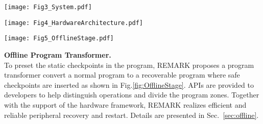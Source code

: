 \begin{figure*}[!htbp]
    \centering
    \texttt{[image: Fig3\_System.pdf]}
    \caption{The HW/SW co-designed system diagram of REMARK.}
    \label{fig:SystemArchitecture}
\end{figure*}

%
\begin{figure*}[!htpb]
    \centering
    \texttt{[image: Fig4\_HardwareArchitecture.pdf]}
    \caption{The hardware architecture of REMARK and its main modules. }
    \label{fig:HardwareArchitecture}
\end{figure*}

\begin{figure*}[!htbp]
    \centering
    \texttt{[image: Fig5\_OfflineStage.pdf]}
    \caption{The program pre-processes during the software transformation stage.}
    \label{fig:OfflineStage}
\end{figure*}


\noindent\textbf{Offline Program Transformer.} \\
%
To preset the static checkpoints in the program, REMARK proposes a program transformer convert a normal program to a recoverable program where safe checkpoints are inserted as shown in Fig.\ref{fig:OfflineStage}.
APIs are provided to developers to help distinguish operations and divide the program zones.
Together with the support of the hardware framework, REMARK realizes efficient and reliable peripheral recovery and restart.
Details are presented in Sec.~\ref{sec:offline}.


\begin{comment}
\noindent\textbf{Online Recover Procedure.} \\
With the support of hardware architecture and the offline program transformer, an online recover procedure is proposed containing two parts, peripheral configuration and restart.
Based on PSRs, REMARK adopts an `init-used' strategy which only initializes and configures the invoked peripherals to avoid redundant reconfiguration overheads.
A config function queue (CFQ) is used to track and stores the peripheral configuration information.
The peripheral restart is realized by Initiator where peripheral checkpoints are stored.
Initiator is supported by the bootstrap in B/R Manager to control the system restart work flow.
After power failure, Initiator restarts all the checkpointed peripherals instantly and individually.
Considering the interactions of devices, the reliability of the entire recover procedure is guaranteed by the flexible B/R functions.
Details are explained in Sec.~\ref{sec:online}.
\end{comment}



